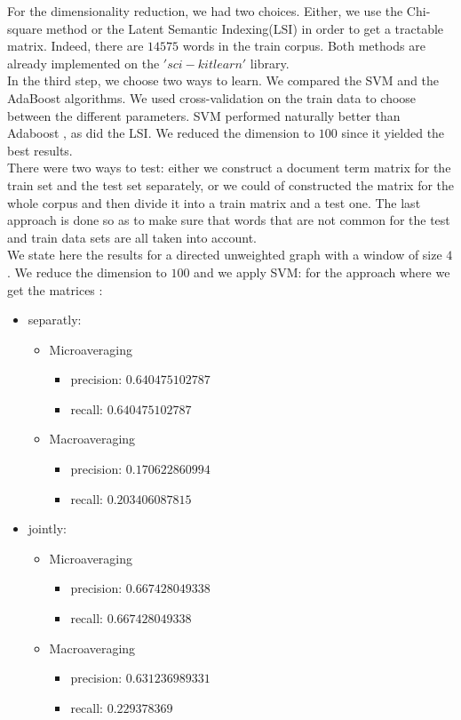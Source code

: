 For the dimensionality reduction, we had two choices. Either, we use the Chi-square method or the Latent Semantic Indexing(LSI) in order to get a tractable matrix. Indeed, there are $14575$ words in the train corpus. Both methods are already implemented on the $'sci-kit learn'$ library. \\

In the third step, we choose two ways to learn. We compared the SVM and the AdaBoost algorithms. We used cross-validation on the train data to choose between the different parameters. SVM performed naturally better than Adaboost , as did the LSI. We reduced the dimension to $100$ since it yielded the best results.\\

There were two ways to test: either we construct a document term matrix for the train set and the test set separately, or we could of constructed the matrix for the whole corpus and then divide it into a train matrix and a test one. The last approach is done so as to make sure that words that are not common for the test and train data sets are all taken into account.\\

We state here the results for a directed unweighted graph with a window of size $4$. We reduce the dimension to $100$ and we apply SVM: for the approach where we get the matrices :\\
\begin{itemize}
	 \item separatly: \begin{itemize}
	 	\item Microaveraging \begin{itemize}
	 		\item precision: $0.640475102787$ 
	 		\item recall: $0.640475102787$
	 	\end{itemize}
	 	\item Macroaveraging \begin{itemize}
	 		\item precision: $0.170622860994$
	 		\item recall: $0.203406087815$
	 	\end{itemize}
	 \end{itemize}
	 
	 \item jointly: \begin{itemize}
	 	\item Microaveraging \begin{itemize}
	 		\item precision: $0.667428049338$ 
	 		\item recall: $0.667428049338$
	 	\end{itemize}
	 	\item Macroaveraging \begin{itemize}
	 		\item precision: $0.631236989331$
	 		\item recall: $0.229378369$
	 	\end{itemize}
	 \end{itemize}
\end{itemize}

